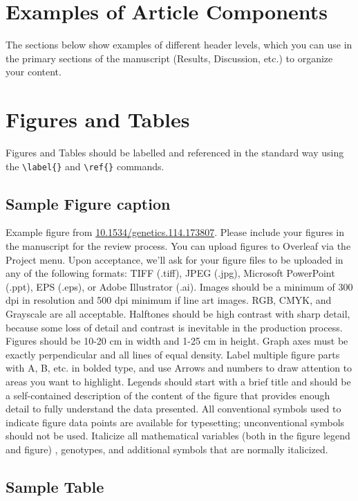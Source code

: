 \documentclass[9pt,twocolumn,twoside,lineno]{gsajnl}
\begin{document}
\section{Examples of Article Components}
\label{sec:examples}

The sections below show examples of different header levels, which you can use in the primary sections of the manuscript (Results, Discussion, etc.) to organize your content.

\section{Figures and Tables}

Figures and Tables should be labelled and referenced in the standard way using the \verb|\label{}| and \verb|\ref{}| commands.

\subsection{Sample Figure caption}

Example figure from \url{10.1534/genetics.114.173807}. Please include your figures in the manuscript for the review process. You can upload figures to Overleaf via the Project menu. Upon acceptance, we'll ask for your figure files to be uploaded in any of the following formats: TIFF (.tiff), JPEG (.jpg), Microsoft PowerPoint (.ppt), EPS (.eps), or Adobe Illustrator (.ai).  Images should be a minimum of 300 dpi in resolution and 500 dpi minimum if line art images.  RGB, CMYK, and Grayscale are all acceptable. Halftones should be high contrast with sharp detail, because some loss of detail and contrast is inevitable in the production process. Figures should be 10-20 cm in width and 1-25 cm in height. Graph axes must be exactly perpendicular and all lines of equal density.
Label multiple figure parts with A, B, etc. in bolded type, and use Arrows and numbers to draw attention to areas you want to highlight. Legends should start with a brief title and should be a self-contained description of the content of the figure that provides enough detail to fully understand the data presented. All conventional symbols used to indicate figure data points are available for typesetting; unconventional symbols should not be used. Italicize all mathematical variables (both in the figure legend and figure) , genotypes, and additional symbols that are normally italicized.  

\subsection{Sample Table}
\end{document}

